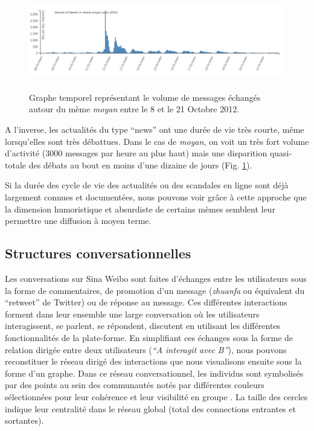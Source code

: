 \begin{figure}[h!]
    \centering
    \includegraphics[width=6.0087in,height=1.6697in]{figures/chap4/chapitre4-img6.png}
    \caption{
      Graphe temporel représentant le volume de messages échangés autour du mème \textit{moyan} entre le 8 et le 21 Octobre 2012.
    }
    \label{fig:time-moyan}
\end{figure}

A l{\textquoteright}inverse, les actualités du type {\textquotedblleft}news{\textquotedblright} ont une durée de vie très courte, même lorsqu{\textquoteright}elles sont très débattues. Dans le cas de \textit{moyan}, on voit un très fort volume d{\textquoteright}activité (3000 messages par heure au plus haut) mais une disparition quasi-totale des débats au bout en moins d{\textquoteright}une dizaine de jours (Fig. \ref{fig:time-moyan}).

Si la durée des cycle de vie des actualités ou des scandales en ligne sont déjà largement connues et documentées, nous pouvons voir grâce à cette approche que la dimension humoristique et absurdiste de certains mèmes semblent leur permettre une diffusion à moyen terme.


\subsection[Structures conversationnelles]{Structures conversationnelles}

Les conversations sur Sina Weibo sont faites d{\textquoteright}échanges entre les utilisateurs sous la forme de commentaires, de promotion d{\textquoteright}un message (\textit{zhuanfa} ou  équivalent du {\textquotedblleft}retweet{\textquotedblright} de Twitter) ou de réponse au message. Ces différentes interactions forment dans leur ensemble une large conversation o\`u les utilisateurs interagissent, se parlent, se répondent, discutent en utilisant les différentes fonctionnalités de la plate-forme. En simplifiant ces échanges sous la forme de relation dirigée entre deux utilisateurs (\textit{{\textquotedblleft}A interagit avec B{\textquotedblright}}), nous pouvons reconstituer le réseau dirigé des interactions que nous visualisons ensuite sous la forme d{\textquoteright}un graphe. Dans ce réseau conversationnel, les individus sont symbolisés par des points au sein des communautés notés par différentes couleurs sélectionnées pour leur cohérence et leur visibilité en groupe \citep{Lin2013}. La taille des cercles indique leur centralité dans le réseau global (total des connections entrantes et sortantes).


